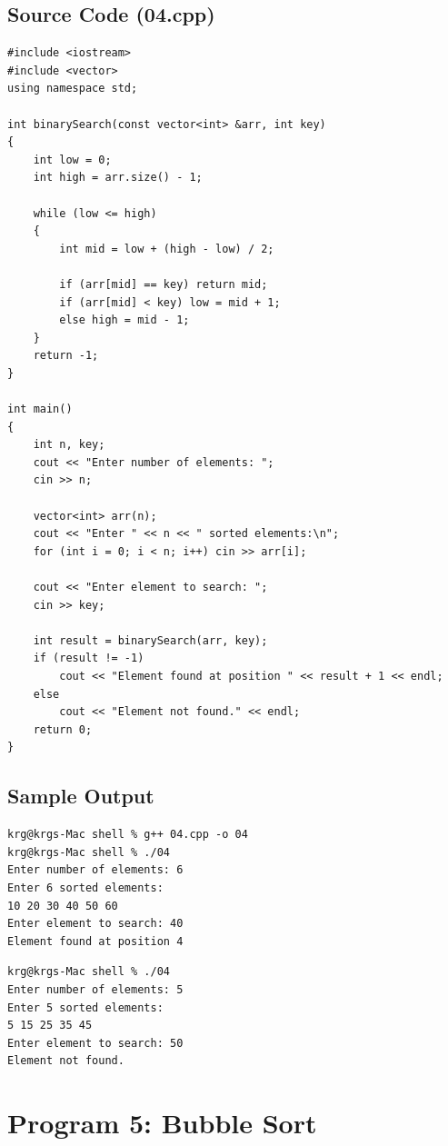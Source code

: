 \documentclass[a4paper,12pt]{article}
\begin{document}
\subsection*{Source Code (04.cpp)}
\begin{lstlisting}[style=cppstyle]
#include <iostream>
#include <vector>
using namespace std;

int binarySearch(const vector<int> &arr, int key)
{
    int low = 0;
    int high = arr.size() - 1;

    while (low <= high)
    {
        int mid = low + (high - low) / 2;

        if (arr[mid] == key) return mid;
        if (arr[mid] < key) low = mid + 1;
        else high = mid - 1;
    }
    return -1;
}

int main()
{
    int n, key;
    cout << "Enter number of elements: ";
    cin >> n;

    vector<int> arr(n);
    cout << "Enter " << n << " sorted elements:\n";
    for (int i = 0; i < n; i++) cin >> arr[i];

    cout << "Enter element to search: ";
    cin >> key;

    int result = binarySearch(arr, key);
    if (result != -1)
        cout << "Element found at position " << result + 1 << endl;
    else
        cout << "Element not found." << endl;
    return 0;
}
\end{lstlisting}

\subsection*{Sample Output}
\begin{lstlisting}[style=outputstyle]
krg@krgs-Mac shell % g++ 04.cpp -o 04
krg@krgs-Mac shell % ./04
Enter number of elements: 6
Enter 6 sorted elements:
10 20 30 40 50 60
Enter element to search: 40
Element found at position 4
\end{lstlisting}

\begin{lstlisting}[style=outputstyle]
krg@krgs-Mac shell % ./04
Enter number of elements: 5
Enter 5 sorted elements:
5 15 25 35 45
Enter element to search: 50
Element not found.
\end{lstlisting}

\newpage

\section*{Program 5: Bubble Sort}
\end{document}
